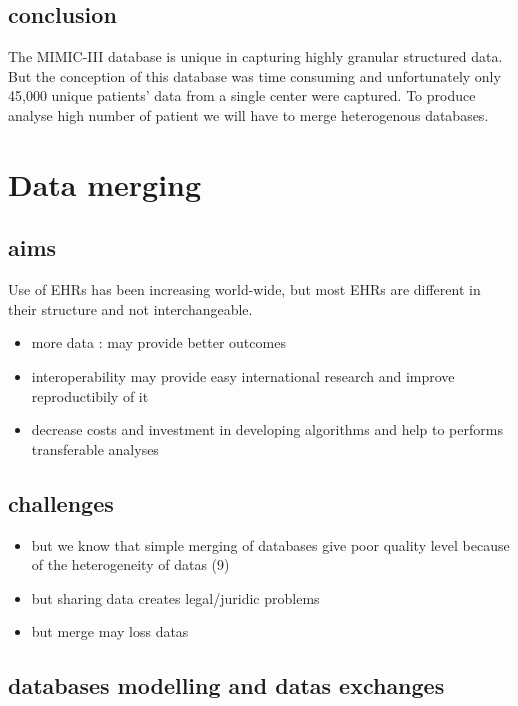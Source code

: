 \subsection{conclusion}\label{conclusion}

The MIMIC-III database is unique in capturing highly granular structured
data. But the conception of this database was time consuming and
unfortunately only 45,000 unique patients' data from a single center
were captured. To produce analyse high number of patient we will have to
merge heterogenous databases.

\section{Data merging}\label{data-merging}

\subsection{aims}\label{aims}

Use of EHRs has been increasing world-wide, but most EHRs are different
in their structure and not interchangeable.

\begin{itemize}
\tightlist
\item
  more data : may provide better outcomes
\item
  interoperability may provide easy international research and improve
  reproductibily of it
\item
  decrease costs and investment in developing algorithms and help to
  performs transferable analyses
\end{itemize}

\subsection{challenges}\label{challenges}

\begin{itemize}
\tightlist
\item
  but we know that simple merging of databases give poor quality level
  because of the heterogeneity of datas (9)
\item
  but sharing data creates legal/juridic problems
\item
  but merge may loss datas
\end{itemize}

\subsection{databases modelling and datas
exchanges}\label{databases-modelling-and-datas-exchanges}

